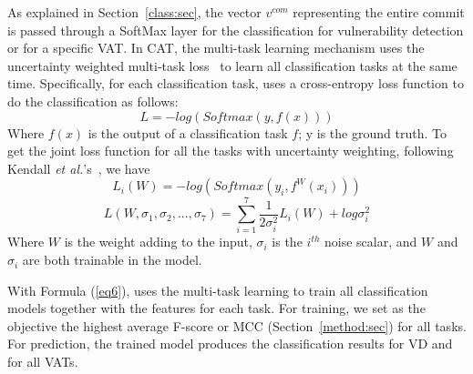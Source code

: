 As explained in Section~\ref{class:sec}, the vector $v^{com}$
representing the entire commit is passed through a SoftMax layer for
the classification for vulnerability detection or for a specific VAT.
In CAT, the multi-task learning mechanism uses the uncertainty
weighted multi-task loss~\cite{kendall2018multi} to learn all 
classification tasks at the same time. Specifically, for each
classification task, \tool uses a cross-entropy loss function to do
the classification as follows:
\begin{equation}\label{eq4}
	L = -log(Softmax(y, f(x)))
\end{equation}
Where $f(x)$ is the output of a classification task $f$; y is the
ground truth. To get the joint loss function for all the tasks with
uncertainty weighting, following Kendall {\em et
  al.}'s~\cite{kendall2018multi}, we have
\begin{equation}\label{eq5}
	L_i(W) = -log(Softmax(y_i, f^W(x_i)))
\end{equation}
\begin{equation}\label{eq6}
	L(W, \sigma_1, \sigma_2, ..., \sigma_7) = \sum_{i=1}^7\frac{1}{2\sigma_i^2}L_i(W) + log \sigma^2_i
\end{equation}
Where $W$ is the weight adding to the input, $\sigma_i$ is the
$i^{th}$ noise scalar, and $W$ and $\sigma_i$ are both trainable in
the model.

With Formula (\ref{eq6}), {\tool} uses the multi-task
learning to train all classification models together with the
features for each task. For training, we set as the objective the
highest average F-score or MCC (Section~\ref{method:sec}) for all
tasks. For prediction, the trained model produces the
classification results for VD and for all VATs.



